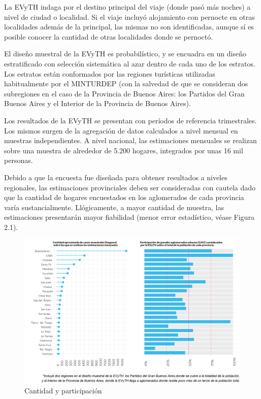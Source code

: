\documentclass[
  openany]{book}
\begin{document}
La EVyTH indaga por el destino principal del viaje (donde pasó más noches) a nivel de ciudad o localidad.
Si el viaje incluyó alojamiento con pernocte en otras localidades además de la principal, las mismas no son identificadas, aunque sí es posible conocer la cantidad de otras localidades donde se pernoctó.

El diseño muestral de la EVyTH es probabilístico, y se encuadra en un diseño estratificado con selección sistemática al azar dentro de cada uno de los estratos.
Los estratos están conformados por las regiones turísticas utilizadas habitualmente por el MINTURDEP (con la salvedad de que se consideran dos subregiones en el caso de la Provincia de Buenos Aires: los Partidos del Gran Buenos Aires y el Interior de la Provincia de Buenos Aires).

Los resultados de la EVyTH se presentan con períodos de referencia trimestrales.
Los mismos surgen de la agregación de datos calculados a nivel mensual en muestras independientes.
A nivel nacional, las estimaciones mensuales se realizan sobre una muestra de alrededor de 5.200 hogares, integrados por unas 16 mil personas.

Debido a que la encuesta fue diseñada para obtener resultados a niveles regionales, las estimaciones provinciales deben ser consideradas con cautela dado que la cantidad de hogares encuestados en los aglomerados de cada provincia varía sustancialmente.
Llógicamente, a mayor cantidad de muestra, las estimaciones presentarán mayor fiabilidad (menor error estadístico, véase Figura 2.1).

\begin{figure}

{\centering \includegraphics[width=1\linewidth]{imagenes/figura2.1} 

}

\caption{Cantidad y participación}\label{fig:cantidades}
\end{figure}
\end{document}
